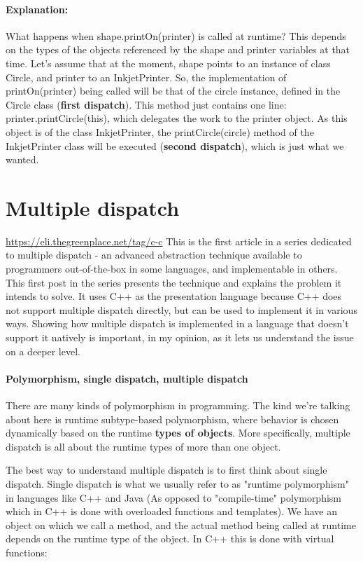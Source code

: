 \documentclass{book}
\begin{document}
\paragraph{Explanation:}
What happens when shape.printOn(printer) is called at runtime? This depends on the types of the objects referenced by the shape and printer variables at that time.
Let's assume that at the moment, shape points to an instance of class Circle, and printer to an InkjetPrinter.
So, the implementation of printOn(printer) being called will be that of the circle instance, defined in the Circle class (\textbf{first dispatch}).
This method just contains one line: printer.printCircle(this), which delegates the work to the printer object.
As this object is of the class InkjetPrinter, the printCircle(circle) method of the InkjetPrinter class will be executed (\textbf{second dispatch}), which is just what we wanted. 

\section{Multiple dispatch}\label{multid}
\url{https://eli.thegreenplace.net/tag/c-c}
This is the first article in a series dedicated to multiple dispatch - an advanced abstraction technique available to programmers out-of-the-box in some languages, and implementable in others.
This first post in the series presents the technique and explains the problem it intends to solve.
It uses C++ as the presentation language because C++ does not support multiple dispatch directly, but can be used to implement it in various ways.
Showing how multiple dispatch is implemented in a language that doesn't support it natively is important, in my opinion, as it lets us understand the issue on a deeper level.

\paragraph{Polymorphism, single dispatch, multiple dispatch}

There are many kinds of polymorphism in programming. 
The kind we're talking about here is runtime subtype-based polymorphism, where behavior is chosen dynamically based on the runtime \textbf{types of objects}.
More specifically, multiple dispatch is all about the runtime types of more than one object.

The best way to understand multiple dispatch is to first think about single dispatch.
Single dispatch is what we usually refer to as "runtime polymorphism" in languages like C++ and Java (As opposed to "compile-time" polymorphism which in C++ 
is done with overloaded functions and templates).
We have an object on which we call a method, and the actual method being called at runtime depends on the runtime type of the object.
In C++ this is done with virtual functions:
\end{document}
